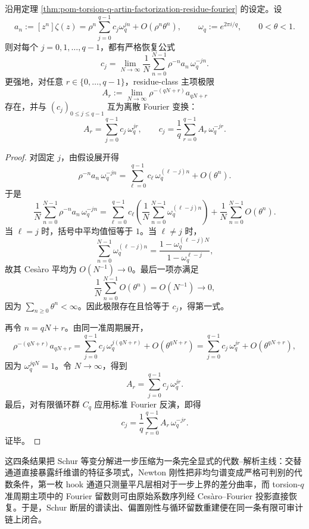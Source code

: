 \begin{theorem}\label{thm:xi-time-part63a-torsion-q-cesaro-fourier-projection}
沿用定理 \ref{thm:pom-torsion-q-artin-factorization-residue-fourier} 的设定。设
\[
a_n:=[z^n]\zeta(z)
=
\rho^n\sum_{j=0}^{q-1}c_j\omega_q^{jn}
+
O(\rho^n\theta^n),
\qquad
\omega_q:=e^{2\pi i/q},
\qquad
0<\theta<1.
\]
则对每个 \(j=0,1,\dots,q-1\)，都有严格恢复公式
\[
\boxed{\;
c_j=
\lim_{N\to\infty}
\frac{1}{N}\sum_{n=0}^{N-1}\rho^{-n}a_n\,\omega_q^{-jn}.\;}
\]
更强地，对任意 \(r\in\{0,\dots,q-1\}\)，residue-class 主项极限
\[
A_r:=
\lim_{N\to\infty}\rho^{-(qN+r)}a_{qN+r}
\]
存在，并与 \((c_j)_{0\le j\le q-1}\) 互为离散 Fourier 变换：
\[
\boxed{\;
A_r=\sum_{j=0}^{q-1}c_j\,\omega_q^{jr},
\qquad
c_j=\frac{1}{q}\sum_{r=0}^{q-1}A_r\,\omega_q^{-jr}.\;}
\]
\end{theorem}
\begin{proof}
对固定 \(j\)，由假设展开得
\[
\rho^{-n}a_n\,\omega_q^{-jn}
=
\sum_{\ell=0}^{q-1}c_\ell\,\omega_q^{(\ell-j)n}
+
O(\theta^n).
\]
于是
\[
\frac{1}{N}\sum_{n=0}^{N-1}\rho^{-n}a_n\,\omega_q^{-jn}
=
\sum_{\ell=0}^{q-1}c_\ell
\left(
\frac{1}{N}\sum_{n=0}^{N-1}\omega_q^{(\ell-j)n}
\right)
+
\frac{1}{N}\sum_{n=0}^{N-1}O(\theta^n).
\]
当 \(\ell=j\) 时，括号中平均值恒等于 \(1\)。当 \(\ell\neq j\) 时，
\[
\sum_{n=0}^{N-1}\omega_q^{(\ell-j)n}
=
\frac{1-\omega_q^{(\ell-j)N}}{1-\omega_q^{\ell-j}},
\]
故其 Ces\`aro 平均为 \(O(N^{-1})\to 0\)。最后一项亦满足
\[
\frac{1}{N}\sum_{n=0}^{N-1}O(\theta^n)=O(N^{-1})\to 0,
\]
因为 \(\sum_{n\ge 0}\theta^n<\infty\)。因此极限存在且恰等于 \(c_j\)，得第一式。

再令 \(n=qN+r\)。由同一准周期展开，
\[
\rho^{-(qN+r)}a_{qN+r}
=
\sum_{j=0}^{q-1}c_j\,\omega_q^{j(qN+r)}
+
O(\theta^{qN+r})
=
\sum_{j=0}^{q-1}c_j\,\omega_q^{jr}
+
O(\theta^{qN+r}),
\]
因为 \(\omega_q^{jqN}=1\)。令 \(N\to\infty\)，得到
\[
A_r=\sum_{j=0}^{q-1}c_j\,\omega_q^{jr}.
\]
最后，对有限循环群 \(C_q\) 应用标准 Fourier 反演，即得
\[
c_j=\frac{1}{q}\sum_{r=0}^{q-1}A_r\,\omega_q^{-jr}.
\]
证毕。
\end{proof}

\noindent
这四条结果把 Schur 等变分解进一步压缩为一条完全显式的代数--解析主线：交替通道直接暴露纤维谱的特征多项式，Newton 刚性把非均匀谱变成严格可判别的代数条件，第一枚 hook 通道只测量平凡层相对于一步上界的差分曲率，而 torsion-\(q\) 准周期主项中的 Fourier 留数则可由原始系数序列经 Ces\`aro--Fourier 投影直接恢复。于是，Schur 断层的谱读出、偏置刚性与循环留数重建便在同一条有限可审计链上闭合。

\endinput
